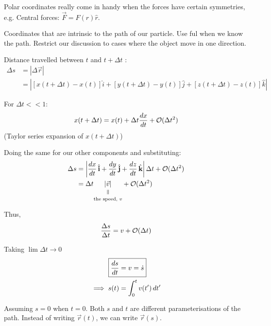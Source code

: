 \documentclass[10pt]{scrartcl}
\begin{document}
Polar coordinates really come in handy when the forces have certain symmetries, e.g. Central forces: $\vec{F} = F(r)\hat{r}$.




Coordinates 
 that are intrinsic to the path of our particle. Use ful when we know the path. Restrict our discussion to cases where the object move in one direction.
 
\begin{center}
\end{center}

Distance travelled between $t$ and $t + \Delta t$
:
\[\begin{aligned}\Delta s &= |\Delta \vec{r}|\\
& = \left|[x(t + \Delta t) - x(t)]\hat{i} + [y(t + \Delta t) - y(t)]\hat{j} + [z(t + \Delta t) - z(t)]\hat{k}\right|	
\end{aligned}
\]

For $\Delta t << 1$: 
\[x(t + \Delta t) = x(t) + \Delta t \frac{dx}{dt} + \cal{O}(\Delta t^2)\]
(Taylor series expansion of $x(t + \Delta t)$)

Doing the same for our other components and substituting:
\begin{align*}
\Delta s &= \left|\frac{dx}{dt}\hat{i} + \frac{dy}{dt}\hat{j} + \frac{dz}{dt}\hat{k}\right|\Delta t + \cal{O}(\Delta t^2)\\
&= \Delta t \equalto{|\vec{v}|}{\text{the speed, }v} + \cal{O}(\Delta t^2)
\end{align*}

Thus,
\[\frac{\Delta s}{\Delta t} = v + \cal{O}(\Delta t)\]

Taking $\lim \Delta t \to 0$
\[\begin{aligned}\Aboxed{\frac{ds}{dt} &= v = \dot{s}}\\ 
\implies s(t) &= \int_0^t v(t')\,dt'	
\end{aligned}
\]

Assuming $s = 0$ when $t = 0$. Both $s$ and $t$ are different parameterisations of the path. Instead of writing $\vec{r}(t)$, we can write $\vec{r}(s)$. \\
\end{document}
